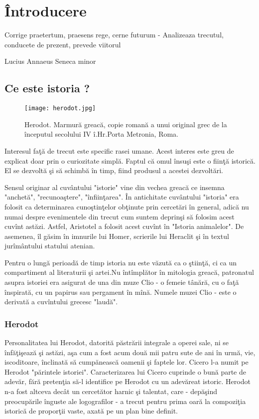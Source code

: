 \chapter{Întroducere}
\epigraph{Corrige praetertum, praesens rege, cerne futurum - Analizeaza trecutul, conducete de prezent, prevede viitorul }{Lucius Annaeus Seneca minor}
\section{Ce este istoria ?}
\begin{wrapfigure}[16]{r}{0.2\linewidth} 
    \texttt{[image: herodot.jpg]}
    \caption{Herodot. Marmură greacă, copie romană a unui original grec de la începutul secolului IV î.Hr.Porta Metronia, Roma.}
    \label{fig:pca}
\end{wrapfigure}
Interesul faţă de trecut este specific rasei umane. Acest interes este greu de explicat doar prin o curiozitate simplă. Faptul că omul însuşi  este o fiinţă istorică.  El se dezvoltă şi să schimbă în timp, fiind produsul a acestei dezvoltări.

Sensul originar al cuvântului "istorie" vine din vechea  greacă  ce insemna "anchetă", "recunoaştere", "înfiinţarea". În antichitate cuvântului "istoria" era folosit ca determinarea cunoştinţelor obţinute prin cercetări în general, adică nu numai despre evenimentele din trecut cum suntem deprinşi să folosim acest cuvînt astăzi. Astfel, Aristotel a folosit acest cuvînt în "Istoria animalelor". De asemenea, îl găsim în imnurile lui Homer, scrierile lui Heraclit şi în textul jurîmântului statului atenian.

Pentru o lungă perioadă de timp istoria nu este văzută ca o ştiinţă, ci  ca un compartiment al literaturii şi artei.Nu întîmplător în mitologia greacă, patronatul asupra istoriei era asigurat de una din muze Clio - o femeie tânără, cu o faţă înspirată, cu un papirus sau pergament în mînă. Numele  muzei Clio - este o derivată  a cuvîntului  grecesc "laudă".

\subsection{Herodot}
Personalitatea lui Herodot, datorită păstrării integrale a operei sale, ni se înfăţişează şi astăzi, aşa cum a fost acum două mii patru sute de ani în urmă, vie, iscoditoare, înclinată să cumpănească oamenii şi faptele lor. Cicero l-a numit pe Herodot "părintele istoriei". Caracterizarea lui Cicero cuprinde o bună parte de adevăr, fără pretenţia să-l identifice pe Herodot cu un adevăreat istoric. Herodot n-a fost altceva decât un cercetător harnic şi talentat, care - depăşind preocupările înguste ale logografilor - a trecut pentru prima oară la compoziţia istorică de proporţii vaste, axată pe un plan bine definit.

